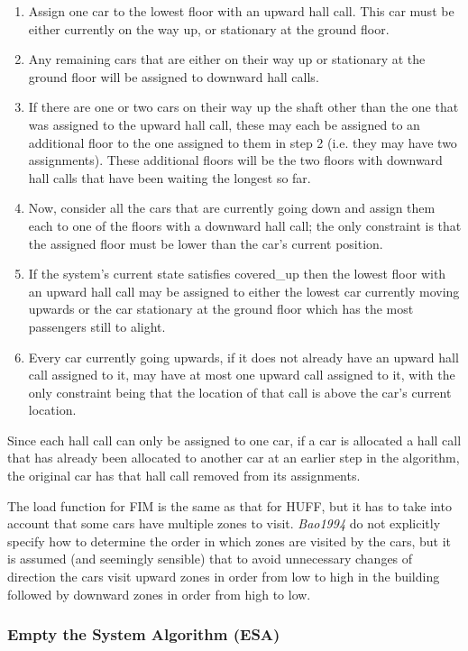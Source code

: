 \documentclass{UoYCSproject}
\begin{document}
\begin{enumerate}
	\item Assign one car to the lowest floor with an upward hall call.  This car must be either currently on the way up, or stationary at the ground floor.
	\item Any remaining cars that are either on their way up or stationary at the ground floor will be assigned to downward hall calls.
	\item If there are one or two cars on their way up the shaft other than the one that was assigned to the upward hall call, these may each be assigned to an additional floor to the one assigned to them in step 2 (i.e. they may have two assignments).  These additional floors will be the two floors with downward hall calls that have been waiting the longest so far.
	\item Now, consider all the cars that are currently going down and assign them each to one of the floors with a downward hall call; the only constraint is that the assigned floor must be lower than the car's current position.
	\item If the system's current state satisfies covered\_up then the lowest floor with an upward hall call may be assigned to either the lowest car currently moving upwards or the car stationary at the ground floor which has the most passengers still to alight.
	\item Every car currently going upwards, if it does not already have an upward hall call assigned to it, may have at most one upward call assigned to it, with the only constraint being that the location of that call is above the car's current location.
\end{enumerate}

Since each hall call can only be assigned to one car, if a car is allocated a hall call that has already been allocated to another car at an earlier step in the algorithm, the original car has that hall call removed from its assignments.

The load function for FIM is the same as that for HUFF, but it has to take into account that some cars have multiple zones to visit.  \textit{Bao1994} do not explicitly specify how to determine the order in which zones are visited by the cars, but it is assumed (and seemingly sensible) that to avoid unnecessary changes of direction the cars visit upward zones in order from low to high in the building followed by downward zones in order from high to low.

\subsubsection{Empty the System Algorithm (ESA) \citep{Bao1994}}
\label{LitRevESA}
\end{document}

